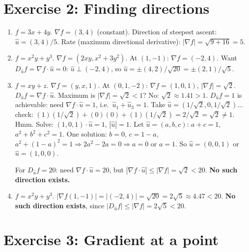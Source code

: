 \documentclass[12pt,a4paper]{article}
\begin{document}
\section*{Exercise 2: Finding directions}

\begin{enumerate}[leftmargin=*, label=(\alph*)]

\item $f=3x+4y$. $\nabla f=(3,4)$ (constant). Direction of steepest ascent: $\hat{u}=(3,4)/5$.
Rate (maximum directional derivative): $|\nabla f|=\sqrt{9+16}=5$.

\item $f=x^2y+y^3$. $\nabla f=(2xy,x^2+3y^2)$. At $(1,-1)$: $\nabla f=(-2,4)$.
Want $D_{\hat{u}}f=\nabla f\cdot\hat{u}=0$: $\hat{u}\perp(-2,4)$, so $\hat{u}=\pm(4,2)/\sqrt{20}=\pm(2,1)/\sqrt{5}$.

\item $f=xy+z$. $\nabla f=(y,x,1)$. At $(0,1,-2)$: $\nabla f=(1,0,1)$, $|\nabla f|=\sqrt{2}$.
$D_{\hat{u}}f=\nabla f\cdot\hat{u}$. Maximum is $|\nabla f|=\sqrt{2}<1$? No: $\sqrt{2}\approx 1.41>1$.
$D_{\hat{u}}f=1$ is achievable: need $\nabla f\cdot\hat{u}=1$, i.e.\ $\hat{u}_1+\hat{u}_3=1$.
Take $\hat{u}=(1/\sqrt{2},0,1/\sqrt{2})$... check: $(1)(1/\sqrt{2})+(0)(0)+(1)(1/\sqrt{2})=2/\sqrt{2}=\sqrt{2}\ne 1$.
Hmm. Solve: $(1,0,1)\cdot\hat{u}=1$, $|\hat{u}|=1$. Let $\hat{u}=(a,b,c)$: $a+c=1$, $a^2+b^2+c^2=1$.
One solution: $b=0$, $c=1-a$, $a^2+(1-a)^2=1\Rightarrow 2a^2-2a=0\Rightarrow a=0$ or $a=1$.
So $\hat{u}=(0,0,1)$ or $\hat{u}=(1,0,0)$.

For $D_{\hat{u}}f=20$: need $\nabla f\cdot\hat{u}=20$, but $|\nabla f\cdot\hat{u}|\le|\nabla f|=\sqrt{2}<20$. \textbf{No such direction exists.}

\item $f=x^2y+y^3$. $|\nabla f(1,-1)|=|(-2,4)|=\sqrt{20}=2\sqrt{5}\approx 4.47<20$.
\textbf{No such direction exists}, since $|D_{\hat{u}}f|\le|\nabla f|=2\sqrt{5}<20$.

\end{enumerate}

\section*{Exercise 3: Gradient at a point}
\end{document}
